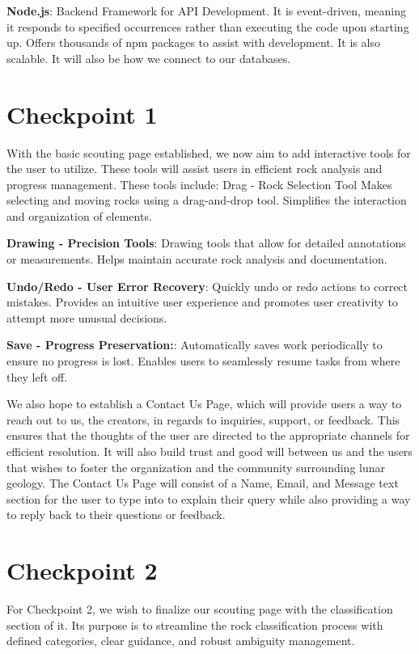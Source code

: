 \documentclass{article}
\begin{document}
\textbf{Node.js}: Backend Framework for API Development. It is event-driven, meaning it responds to specified occurrences rather than executing the code upon starting up. Offers thousands of npm packages to assist with development. It is also scalable. It will also be how we connect to our databases.

\section{Checkpoint 1}
With the basic scouting page established, we now aim to add interactive tools for the user to utilize. These tools
will assist users in efficient rock analysis and progress management. These tools include:
Drag - Rock Selection Tool
Makes selecting and moving rocks using a drag-and-drop tool.
Simplifies the interaction and organization of elements.

\textbf{Drawing - Precision Tools}:
Drawing tools that allow for detailed annotations or measurements.
Helps maintain accurate rock analysis and documentation.

\textbf{Undo/Redo - User Error Recovery}:
Quickly undo or redo actions to correct mistakes.
Provides an intuitive user experience and promotes user creativity to attempt more unusual decisions.

\textbf{Save - Progress Preservation:}:
Automatically saves work periodically to ensure no progress is lost.
Enables users to seamlessly resume tasks from where they left off.

We also hope to establish a Contact Us Page, which will provide users a way to reach out to us, the creators,
in regards to inquiries, support, or feedback. This ensures that the thoughts of the user are directed to the
appropriate channels for efficient resolution. It will also build trust and good will between us and the users
that wishes to foster the organization and the community surrounding lunar geology.
The Contact Us Page will consist of a Name, Email, and Message text section for the user to type into to explain
their query while also providing a way to reply back to their questions or feedback.
\section{Checkpoint 2}
For Checkpoint 2, we wish to finalize our scouting page with the classification section of it. Its purpose is to
streamline the rock classification process with defined categories, clear guidance, and robust ambiguity management.
\end{document}

